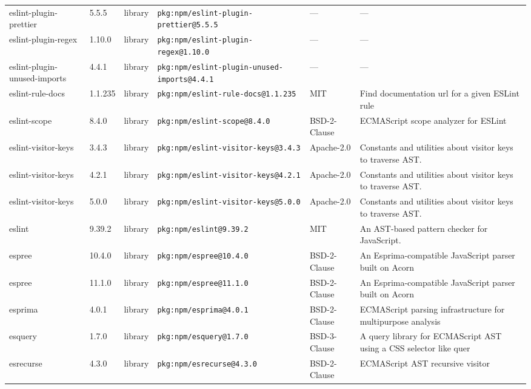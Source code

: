\documentclass[11pt,a4paper]{article}
\begin{document}
\begin{longtable}{|p{4cm}|p{2cm}|p{1.6cm}|p{5cm}|p{1.5cm}|p{3.5cm}|}
\raggedright eslint-plugin-prettier & 5.5.5 & library & \small\texttt{pkg:npm/eslint-plugin-prettier@5.5.5} & — & \small — \\
\raggedright eslint-plugin-regex & 1.10.0 & library & \small\texttt{pkg:npm/eslint-plugin-regex@1.10.0} & — & \small — \\
\raggedright eslint-plugin-unused-imports & 4.4.1 & library & \small\texttt{pkg:npm/eslint-plugin-unused-imports@4.4.1} & — & \small — \\
\raggedright eslint-rule-docs & 1.1.235 & library & \small\texttt{pkg:npm/eslint-rule-docs@1.1.235} & MIT & \small Find documentation url for a given ESLint rule \\
\raggedright eslint-scope & 8.4.0 & library & \small\texttt{pkg:npm/eslint-scope@8.4.0} & BSD-2-Clause & \small ECMAScript scope analyzer for ESLint \\
\raggedright eslint-visitor-keys & 3.4.3 & library & \small\texttt{pkg:npm/eslint-visitor-keys@3.4.3} & Apache-2.0 & \small Constants and utilities about visitor keys to traverse AST. \\
\raggedright eslint-visitor-keys & 4.2.1 & library & \small\texttt{pkg:npm/eslint-visitor-keys@4.2.1} & Apache-2.0 & \small Constants and utilities about visitor keys to traverse AST. \\
\raggedright eslint-visitor-keys & 5.0.0 & library & \small\texttt{pkg:npm/eslint-visitor-keys@5.0.0} & Apache-2.0 & \small Constants and utilities about visitor keys to traverse AST. \\
\raggedright eslint & 9.39.2 & library & \small\texttt{pkg:npm/eslint@9.39.2} & MIT & \small An AST-based pattern checker for JavaScript. \\
\raggedright espree & 10.4.0 & library & \small\texttt{pkg:npm/espree@10.4.0} & BSD-2-Clause & \small An Esprima-compatible JavaScript parser built on Acorn \\
\raggedright espree & 11.1.0 & library & \small\texttt{pkg:npm/espree@11.1.0} & BSD-2-Clause & \small An Esprima-compatible JavaScript parser built on Acorn \\
\raggedright esprima & 4.0.1 & library & \small\texttt{pkg:npm/esprima@4.0.1} & BSD-2-Clause & \small ECMAScript parsing infrastructure for multipurpose analysis \\
\raggedright esquery & 1.7.0 & library & \small\texttt{pkg:npm/esquery@1.7.0} & BSD-3-Clause & \small A query library for ECMAScript AST using a CSS selector like quer \\
\raggedright esrecurse & 4.3.0 & library & \small\texttt{pkg:npm/esrecurse@4.3.0} & BSD-2-Clause & \small ECMAScript AST recursive visitor \\

\end{longtable}
\end{document}
